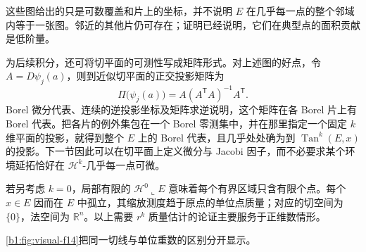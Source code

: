 这些图给出的只是可数覆盖和片上的坐标，并不说明 \(E\) 在几乎每一点的整个邻域内等于一张图。邻近的其他片仍可存在；证明已经说明，它们在典型点的面积贡献是低阶量。

\ProseParagraphBreak

为后续积分，还可将切平面的可测性写成矩阵形式。对上述图的好点，令 \(A=D\psi_j(a)\)，则到近似切平面的正交投影矩阵为
\[
 \Pi\bigl(\psi_j(a)\bigr)=A(A^{\mathsf T}A)^{-1}A^{\mathsf T}.
\]
Borel 微分代表、连续的逆投影坐标及矩阵求逆说明，这个矩阵在各 Borel 片上有 Borel 代表。把各片的例外集包在一个 Borel 零测集中，并在那里指定一个固定 \(k\) 维平面的投影，就得到整个 \(E\) 上的 Borel 代表，且几乎处处确为到 \(\operatorname{Tan}^k(E,x)\) 的投影。下一节因此可以在切平面上定义微分与 Jacobi 因子，而不必要求某个环境延拓恰好在 \(\mathcal H^k\)-几乎每一点可微。

\ProseParagraphBreak

若另考虑 \(k=0\)，局部有限的 \(\mathcal H^0\llcorner E\) 意味着每个有界区域只含有限个点。每个 \(x\in E\) 因而在 \(E\) 中孤立，其缩放测度趋于原点的单位点质量；对应的切空间为 \(\{0\}\)，法空间为 \(\mathbb R^n\)。以上需要 \(r^k\) 质量估计的论证主要服务于正维数情形。

\cref{b1:fig:visual-f14}把同一切线与单位重数的区别分开显示。

